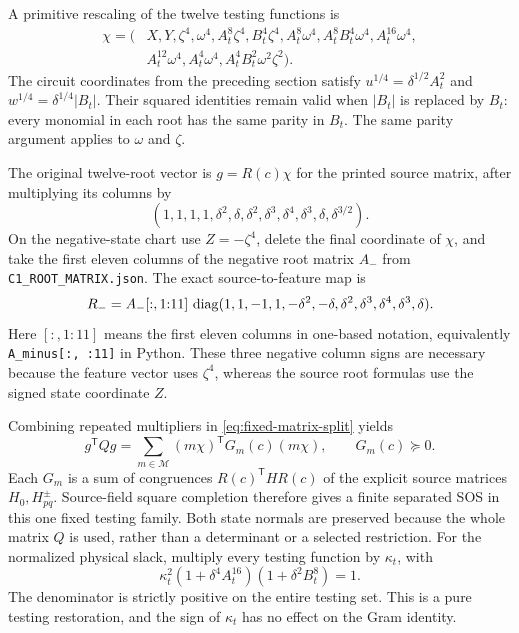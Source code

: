 A primitive rescaling of the twelve testing functions is
\[
\begin{split}
 \chi=(&X,Y,\zeta^4,\omega^4,A_t^8\zeta^4,B_t^4\zeta^4,
 A_t^8\omega^4,A_t^8B_t^4\omega^4,A_t^{16}\omega^4,\\
 &A_t^{12}\omega^4,A_t^4\omega^4,A_t^4B_t^2\omega^2\zeta^2).
\end{split}
\]
The circuit coordinates from the preceding section satisfy
$u^{1/4}=\delta^{1/2}A_t^2$ and $w^{1/4}=\delta^{1/4}|B_t|$.
Their squared identities remain valid when $|B_t|$ is replaced by
$B_t$: every monomial in each root has the same parity in $B_t$.
The same parity argument applies to $\omega$ and $\zeta$.

The original twelve-root vector is $g=R(c)\chi$ for the printed
source matrix, after multiplying its columns by
\[
 (1,1,1,1,\delta^2,\delta,\delta^2,\delta^3,
                 \delta^4,\delta^3,\delta,\delta^{3/2}).
\]
On the negative-state chart use $Z=-\zeta^4$, delete the final
coordinate of $\chi$, and take the first eleven columns of the
negative root matrix $A_-$ from \texttt{C1\_ROOT\_MATRIX.json}.
The exact source-to-feature map is
\[
 R_-=A_-[:,1{:}11]\,
 \operatorname{diag}(1,1,-1,1,-\delta^2,-\delta,\delta^2,\delta^3,
                                  \delta^4,\delta^3,\delta).
\]
Here $[:,1{:}11]$ means the first eleven columns in one-based
notation, equivalently \texttt{A\_minus[:, :11]} in Python.
These three negative column signs are necessary because the
feature vector uses $\zeta^4$, whereas the source root formulas
use the signed state coordinate $Z$.

Combining repeated multipliers in \eqref{eq:fixed-matrix-split} yields
\[
 g^{\mathsf T}Qg
   =\sum_{m\in\mathcal M}(m\chi)^{\mathsf T}G_m(c)(m\chi),
 \qquad G_m(c)\succeq0.
\]
Each $G_m$ is a sum of congruences $R(c)^{\mathsf T}H R(c)$ of the
explicit source matrices $H_0,H_{pq}^{\pm}$. Source-field square
completion therefore gives a finite separated SOS in this one fixed
testing family. Both state normals are preserved because the whole
matrix $Q$ is used, rather than a determinant or a selected restriction.
For the normalized physical slack, multiply every testing function by
$\kappa_t$, with
\[
 \kappa_t^2(1+\delta^4A_t^{16})(1+\delta^2B_t^8)=1.
\]
The denominator is strictly positive on the entire testing set.
This is a pure testing restoration, and the sign of $\kappa_t$ has
no effect on the Gram identity.

